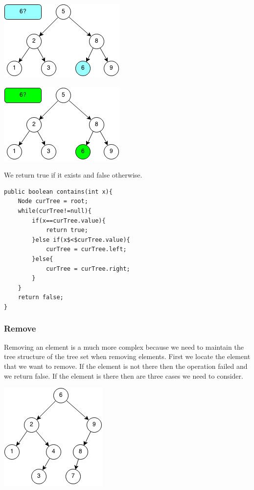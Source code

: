 \documentclass[11pt,oneside]{book}
\makeatletter
\def\maxwidth#1{\ifdim\Gin@nat@width>#1 #1\else\Gin@nat@width\fi}
\makeatother
\begin{document}
\includegraphics[width=\maxwidth{\textwidth}]{bstcontains3.png}

\includegraphics[width=\maxwidth{\textwidth}]{bstcontains4.png}

We return true if it exists and false otherwise.

\begin{lstlisting}
public boolean contains(int x){
    Node curTree = root;
    while(curTree!=null){
        if(x==curTree.value){
            return true;
        }else if(x$<$curTree.value){
            curTree = curTree.left;
        }else{
            curTree = curTree.right;
        }
    }
    return false;
}
\end{lstlisting}

\subsubsection{Remove}

Removing an element is a much more complex because we need to maintain the tree structure of the tree set when removing elements. First we locate the element that we want to remove. If the element is not there then the operation failed and we return false. If the element is there then are three cases we need to consider.

\includegraphics[width=\maxwidth{\textwidth}]{bst-rem.png}
\end{document}
